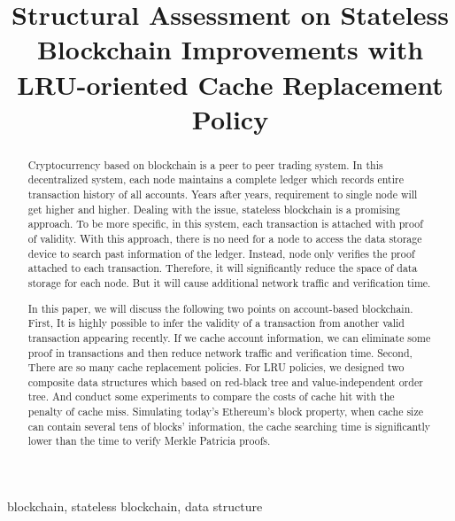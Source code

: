 \documentclass[conference]{IEEEtran}
\begin{document}
\title{Structural Assessment on Stateless Blockchain Improvements with
LRU-oriented Cache Replacement Policy}


\maketitle

\begin{abstract}
Cryptocurrency based on blockchain is a peer to peer trading
system. In this decentralized system,
each node maintains a complete ledger which
records entire transaction history of all accounts.
Years after years, requirement to single node will
get higher and higher. Dealing with the issue, stateless
blockchain is a promising approach. To be more specific,
in this system, each transaction is attached with proof
of validity. With this approach, there is no need for a node
to access the data storage device to search past information
of the ledger. Instead, node only verifies the proof attached
to each transaction. Therefore, it will significantly
reduce the space of data storage for each node.
But it will cause additional network traffic and
verification time.

In this paper, we will discuss the following two points
on account-based blockchain.
First,
It is highly possible to infer the validity of
a transaction from another valid transaction appearing recently.
If we cache account information, we can eliminate some
proof in transactions and then reduce network traffic
and verification time.
Second,
There are so many cache replacement policies.
For LRU policies, we designed two composite data
structures which based on red-black tree and value-independent order tree.
And conduct some experiments to compare the costs of
cache hit with the penalty of cache miss.
Simulating today's Ethereum's block property,
when cache size can contain several tens of blocks' information,
the cache searching time is significantly lower than
the time to verify Merkle Patricia proofs.
\end{abstract}

\begin{IEEEkeywords}
blockchain, stateless blockchain, data structure
\end{IEEEkeywords}
\end{document}

